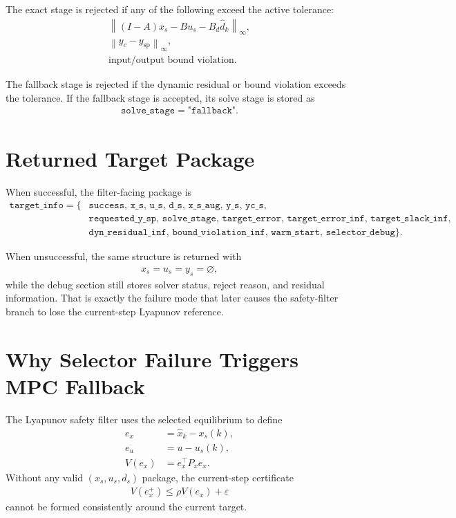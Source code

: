 \documentclass[11pt]{article}
\begin{document}
The exact stage is rejected if any of the following exceed the active tolerance:
\begin{align}
\left\|(I-A)x_s - Bu_s - B_d\hat d_k\right\|_\infty, \\
\left\|y_c - y_{\mathrm{sp}}\right\|_\infty, \\
\text{input/output bound violation}.
\end{align}

The fallback stage is rejected if the dynamic residual or bound violation exceeds the tolerance. If the fallback stage is accepted, its solve stage is stored as
\begin{align}
\texttt{solve\_stage} = \texttt{"fallback"}.
\end{align}

\section{Returned Target Package}
When successful, the filter-facing package is
\begin{align}
\texttt{target\_info} =
\{
&\texttt{success},\,
\texttt{x\_s},\,
\texttt{u\_s},\,
\texttt{d\_s},\,
\texttt{x\_s\_aug},\,
\texttt{y\_s},\,
\texttt{yc\_s}, \nonumber\\
&\texttt{requested\_y\_sp},\,
\texttt{solve\_stage},\,
\texttt{target\_error},\,
\texttt{target\_error\_inf},\,
\texttt{target\_slack\_inf}, \nonumber\\
&\texttt{dyn\_residual\_inf},\,
\texttt{bound\_violation\_inf},\,
\texttt{warm\_start},\,
\texttt{selector\_debug}
\}.
\end{align}

When unsuccessful, the same structure is returned with
\begin{align}
x_s = u_s = y_s = \varnothing,
\end{align}
while the debug section still stores solver status, reject reason, and residual information. That is exactly the failure mode that later causes the safety-filter branch to lose the current-step Lyapunov reference.

\section{Why Selector Failure Triggers MPC Fallback}
The Lyapunov safety filter uses the selected equilibrium to define
\begin{align}
e_x &= \hat x_k - x_s(k), \\
e_u &= u - u_s(k), \\
V(e_x) &= e_x^\top P_x e_x.
\end{align}
Without any valid $(x_s,u_s,d_s)$ package, the current-step certificate
\begin{align}
V(e_x^+) \le \rho V(e_x) + \varepsilon
\end{align}
cannot be formed consistently around the current target.
\end{document}
